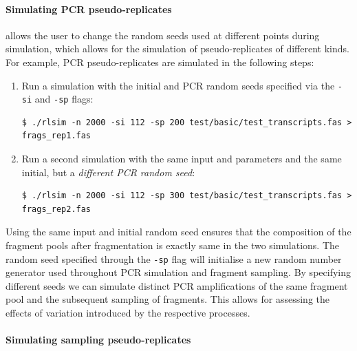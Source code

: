 \vspace{1em}\paragraph{Simulating PCR pseudo-replicates}

\rlsim allows the user to change the random seeds used at different points during simulation, which allows for the simulation
of pseudo-replicates of different kinds. For example, PCR pseudo-replicates are simulated in the following steps:

\begin{enumerate}
    \item{Run a simulation with the initial and PCR random seeds specified via the \texttt{-si} and \texttt{-sp} flags:
        \begin{verbatim}
$ ./rlsim -n 2000 -si 112 -sp 200 test/basic/test_transcripts.fas > frags_rep1.fas
        \end{verbatim}
    }
    \item{Run a second simulation with the same input and parameters and the same initial, but a \emph{different PCR random seed}:
        \begin{verbatim}
$ ./rlsim -n 2000 -si 112 -sp 300 test/basic/test_transcripts.fas > frags_rep2.fas
        \end{verbatim}
    }
\end{enumerate}

Using the same input and initial random seed ensures that the composition of the fragment pools after fragmentation is exactly same in the two simulations.
The random seed specified through the \texttt{-sp} flag will initialise a new random number generator used throughout PCR simulation and fragment sampling. By specifying different seeds we can simulate distinct PCR amplifications of the same fragment pool and the subsequent sampling of fragments. This allows for assessing the effects of variation introduced by the respective processes.


\vspace{1em}\paragraph{Simulating sampling pseudo-replicates}

